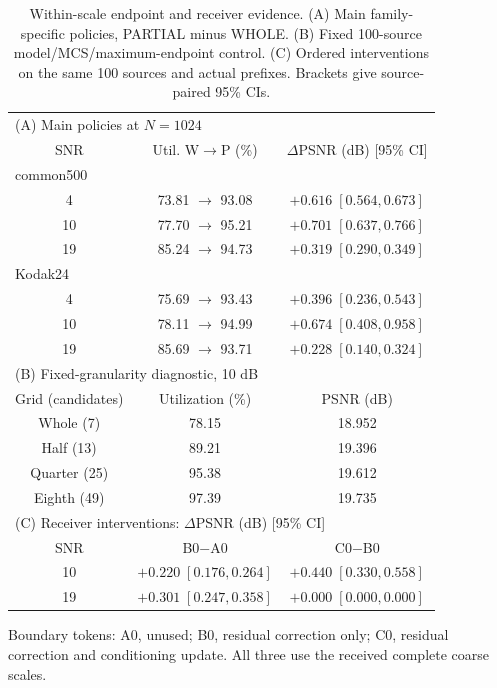 \begin{table}[t]
\caption{Within-scale endpoint and receiver evidence. (A) Main family-specific policies, PARTIAL minus WHOLE. (B) Fixed 100-source model/MCS/maximum-endpoint control. (C) Ordered interventions on the same 100 sources and actual prefixes. Brackets give source-paired 95\% CIs.}
\label{tab:internal}
\centering\footnotesize
\setlength{\tabcolsep}{2.5pt}
\begin{tabular}{ccc}
\toprule
\multicolumn{3}{l}{(A) Main policies at $N=1024$} \\
SNR & Util. W$\to$P (\%) & $\Delta$PSNR (dB) [95\% CI] \\
\midrule
\multicolumn{3}{l}{common500} \\
4 & 73.81 $\to$ 93.08 & $+0.616\;[0.564,0.673]$ \\
10 & 77.70 $\to$ 95.21 & $+0.701\;[0.637,0.766]$ \\
19 & 85.24 $\to$ 94.73 & $+0.319\;[0.290,0.349]$ \\
\multicolumn{3}{l}{Kodak24} \\
4 & 75.69 $\to$ 93.43 & $+0.396\;[0.236,0.543]$ \\
10 & 78.11 $\to$ 94.99 & $+0.674\;[0.408,0.958]$ \\
19 & 85.69 $\to$ 93.71 & $+0.228\;[0.140,0.324]$ \\
\midrule
\multicolumn{3}{l}{(B) Fixed-granularity diagnostic, 10 dB} \\
Grid (candidates) & Utilization (\%) & PSNR (dB) \\
Whole (7) & 78.15 & 18.952 \\
Half (13) & 89.21 & 19.396 \\
Quarter (25) & 95.38 & 19.612 \\
Eighth (49) & 97.39 & 19.735 \\
\midrule
\multicolumn{3}{l}{(C) Receiver interventions: $\Delta$PSNR (dB) [95\% CI]} \\
SNR & B0$-$A0 & C0$-$B0 \\
10 & $+0.220\;[0.176,0.264]$ & $+0.440\;[0.330,0.558]$ \\
19 & $+0.301\;[0.247,0.358]$ & $+0.000\;[0.000,0.000]$ \\
\bottomrule
\end{tabular}
\par\smallskip\parbox{\columnwidth}{\footnotesize Boundary tokens: A0, unused; B0, residual correction only; C0, residual correction and conditioning update. All three use the received complete coarse scales.}
\end{table}
